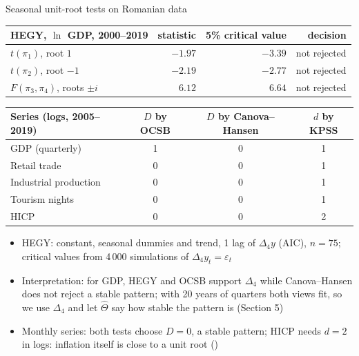 \begin{frame}{Seasonal unit-root tests on Romanian data}
\itemsize{\scriptsize}
\begin{center}
\scriptsize
\begin{tabular}{lrrr}
\toprule
\textbf{HEGY}, $\ln$ GDP, 2000--2019 & statistic & 5\% critical value & decision \\
\midrule
$t(\pi_1)$, root $1$ & $\ensuremath{-}1.97$ & $\ensuremath{-}3.39$ & not rejected \\
$t(\pi_2)$, root $-1$ & $\ensuremath{-}2.19$ & $\ensuremath{-}2.77$ & not rejected \\
$F(\pi_3, \pi_4)$, roots $\pm i$ & $6.12$ & $6.64$ & not rejected \\
\bottomrule
\end{tabular}
\end{center}
\begin{center}
\scriptsize
\begin{tabular}{lccc}
\toprule
\textbf{Series} (logs, 2005--2019) & $D$ by OCSB & $D$ by Canova--Hansen & $d$ by KPSS \\
\midrule
GDP (quarterly) & 1 & 0 & 1 \\
Retail trade & 0 & 0 & 1 \\
Industrial production & 0 & 0 & 1 \\
Tourism nights & 0 & 0 & 1 \\
HICP & 0 & 0 & 2 \\
\bottomrule
\end{tabular}
\end{center}
\begin{itemize}
    \item HEGY: constant, seasonal dummies and trend, 1 lag of $\Delta_4y$ (AIC), $n = 75$; critical values from 4\,000 simulations of $\Delta_4y_t = \varepsilon_t$
    \item Interpretation: for GDP, HEGY and OCSB support $\Delta_4$ while Canova--Hansen does not reject a stable pattern; with 20 years of quarters both views fit, so we use $\Delta_4$ and let $\hat\Theta$ say how stable the pattern is (Section 5)
    \item Monthly series: both tests choose $D = 0$, a stable pattern; HICP needs $d = 2$ in logs: inflation itself is close to a unit root ()
\end{itemize}
\end{frame}

